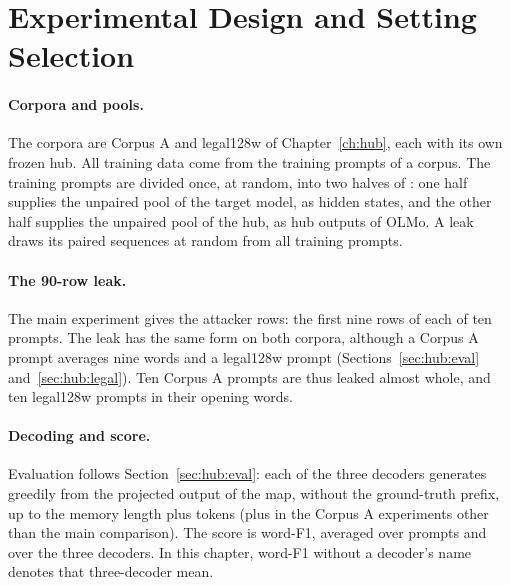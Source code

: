 \section{Experimental Design and Setting Selection}\label{sec:attack:experiments}

\paragraph{Corpora and pools.} The corpora are Corpus A and legal128w of Chapter~\ref{ch:hub}, each with its own frozen hub.
All training data come from the  training prompts of a corpus. %
The training prompts are divided once, at random, into two halves of : one half supplies the unpaired pool of the target model, as hidden states, and the other half supplies the unpaired pool of the hub, as hub outputs of OLMo.
A leak draws its paired sequences at random from all  training prompts. %

\paragraph{The 90-row leak.} The main experiment gives the attacker  rows: the first nine rows of each of ten prompts. %
The leak has the same form on both corpora, although a Corpus A prompt averages nine words and a legal128w prompt  (Sections~\ref{sec:hub:eval} and~\ref{sec:hub:legal}).
Ten Corpus A prompts are thus leaked almost whole, and ten legal128w prompts in their opening words.

\paragraph{Decoding and score.} Evaluation follows Section~\ref{sec:hub:eval}: each of the three decoders generates greedily from the projected output of the map, without the ground-truth prefix, up to the memory length plus  tokens (plus  in the Corpus A experiments other than the main comparison). %
The score is word-F1, averaged over prompts and over the three decoders. %
In this chapter, word-F1 without a decoder's name denotes that three-decoder mean.

